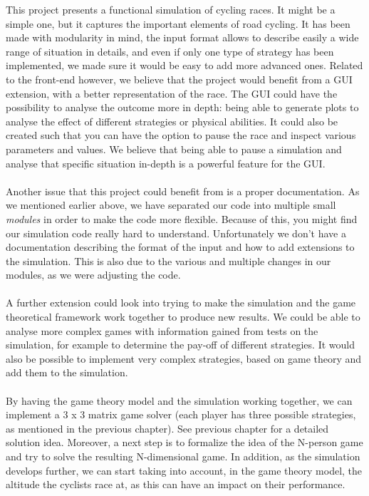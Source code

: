 \documentclass[10pt, a4paper]{report}
\begin{document}



This project presents a functional simulation of cycling races. It might be a simple one, but it captures the important elements of road cycling. It has been made with modularity in mind, the input format allows to describe easily a wide range of situation in details, and even if only one type of strategy has been implemented, we made sure it would be easy to add more advanced ones. Related to the front-end however, we believe that the project would benefit from a GUI extension, with a better representation of the race. The GUI could have the possibility to analyse the outcome more in depth: being able to generate plots to analyse the effect of different strategies or physical abilities. It could also be created such that you can have the option to pause the race and inspect various parameters and values. We believe that being able to pause a simulation and analyse that specific situation in-depth is a powerful feature for the GUI.
\\\\
Another issue that this project could benefit from is a proper documentation. As we mentioned earlier above, we have separated our code into multiple small \textit{modules} in order to make the code more flexible. Because of this, you might find our simulation code really hard to understand. Unfortunately we don't have a documentation describing the format of the input and how to add extensions to the simulation. This is also due to the various and multiple changes in our modules, as we were adjusting the code.\\\\
A further extension could look into trying to make the simulation and the game theoretical framework work together to produce new results. We could be able to analyse more complex games with information gained from tests on the simulation, for example to determine the pay-off of different strategies. It would also be possible to implement very complex strategies, based on game theory and add them to the simulation. \\\\
By having the game theory model and the simulation working together, we can implement a 3 x 3 matrix game solver (each player has three possible strategies, as mentioned in the previous chapter). See previous chapter for a detailed solution idea. Moreover, a next step is to formalize the idea of the N-person game and try to solve the resulting N-dimensional game. In addition, as the simulation develops further, we can start taking into account, in the game theory model, the altitude the cyclists race  at, as this can have an impact on their performance.
\end{document}
